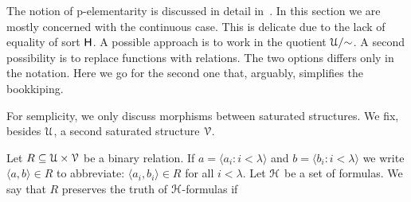 \documentclass{amsproc}
\begin{document}
{\begin{comment}
\begin{fact}\label{fact_pel_invertible}
  Let ${\EuScript F}$ be a p-dense set of positive formulas. 
  If $f$ preserve the truth of formulas in ${\EuScript F}$, then $\varphi(a)\leftrightarrow\varphi(fa)$ for every $\varphi(x)\in{\EuScript F}^{\rm p}$ and every $a\in({\rm dom }f)^{|x|}$.
\end{fact}

\begin{proof}
  Assume $\neg\varphi(a)$ and apply Proposition~\ref{prop_Fapprox} to infer that  $\psi(fa)$ holds for some $\psi(x)\in{\EuScript F}^{\rm p}$ that implies $\neg\varphi(x)$.
\end{proof}

If $f$ is p-elementary, ${\rm dom}f\subseteq M$, and ${\rm range}f\subseteq N$ then we say that $f:M\rightarrow N$ is p-elementary.
This terminology is convenient but imprecise.
More correctly, in~\cite{clcl} such maps are called \textit{approximate\/} p-elementary.
In fact, from the elementarity of $f:{\EuScript U}\rightarrow{\EuScript U}$ we can (only) infer that

\ceq{\hfill M\models\{\varphi(a)\}'}{\Leftrightarrow}{N\models\{\varphi(fa)\}'.}

As below we always evaluate formulas in ${\EuScript U}$, we can safely drop the modifier \textit{approximate}.
  
\end{comment}

The notion of p-elementarity is discussed in detail in~\cite{clcl}.
In this section we are mostly concerned with the continuous case.
This is delicate due to the lack of equality of sort ${\sf H}$.
A possible approach is to work in the quotient ${\EuScript U}/{\sim}$.
A second possibility is to replace functions with relations.
The two options differs only in the notation.
Here we go for the second one that, arguably, simplifies the bookkiping.

For semplicity, we only discuss morphisms between saturated structures.
We fix, besides ${\EuScript U}$, a second saturated structure ${\EuScript V}$.

Let $R\mathrel{\subseteq}{\EuScript U}\times{\EuScript V}$ be a binary relation.
If $a=\langle a_i:i<\lambda\rangle$ and $b=\langle b_i:i<\lambda\rangle$ we write $\langle a,b\rangle\in R$ to abbreviate: $\langle a_i,b_i\rangle\in R$ for all $i<\lambda$.
Let ${\EuScript H}$ be a set of formulas.
We say that $R$ preserves the truth of ${\EuScript H}$-formulas if 

}
\end{document}
